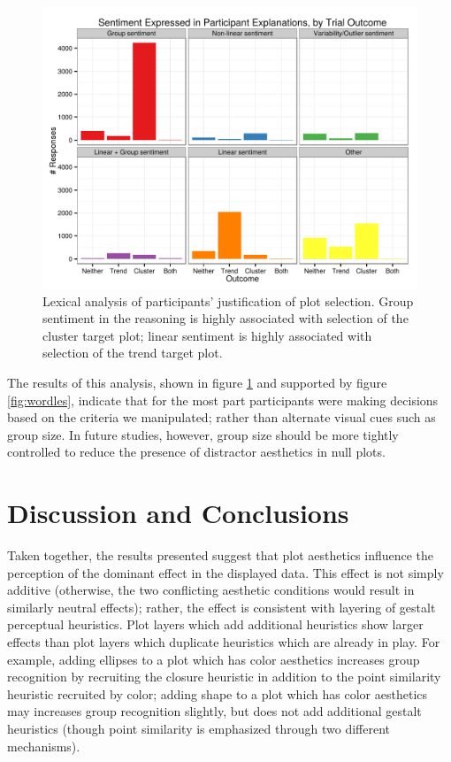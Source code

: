 \documentclass[11pt]{isuthesis}\usepackage[]{graphicx}\usepackage[]{color}
\newenvironment{knitrout}{}{} %
\begin{document}
\begin{figure}[ht]\centering
\begin{knitrout}
\color{fgcolor}

{\centering \includegraphics[width=.8\linewidth]{Figure/FeatureHierarchy/fig-lexical-analysis-1} 

}



\end{knitrout}
\caption[Lexical analysis of participant reasoning]{Lexical analysis of participants' justification of plot selection. Group sentiment in the reasoning is highly associated with selection of the cluster target plot; linear sentiment is highly associated with selection of the trend target plot.}\label{fig:lexicalanalysis}
\end{figure}

The results of this analysis, shown in figure \ref{fig:lexicalanalysis} and supported by figure \ref{fig:wordles}, indicate that for the most part participants were making decisions based on the criteria we manipulated; rather than alternate visual cues such as group size. In future studies, however, group size should be more tightly controlled to reduce the presence of distractor aesthetics in null plots. 

\section{Discussion and Conclusions}\label{sec:Conclusion}

Taken together, the results presented suggest that plot aesthetics influence the perception of the dominant effect in the displayed data. This effect is not simply additive (otherwise, the two conflicting aesthetic conditions would result in similarly neutral effects); rather, the effect is consistent with layering of gestalt perceptual heuristics. Plot layers which add additional heuristics show larger effects than plot layers which duplicate heuristics which are already in play. For example, adding ellipses to a plot which has color aesthetics increases group recognition by recruiting the closure heuristic in addition to the point similarity heuristic recruited by color; adding shape to a plot which has color aesthetics may increases group recognition slightly, but does not add additional gestalt heuristics (though point similarity is emphasized through two different mechanisms). 
\end{document}

